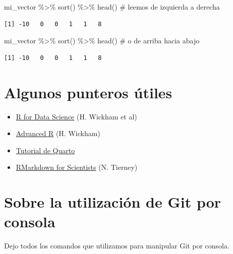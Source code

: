 \documentclass[
  letterpaper,
  DIV=11,
  numbers=noendperiod]{scrartcl}
\newenvironment{Shaded}{\begin{snugshade}}{\end{snugshade}}
\newcommand{\CommentTok}[1]{\textcolor[rgb]{0.37,0.37,0.37}{#1}}
\newcommand{\FunctionTok}[1]{\textcolor[rgb]{0.28,0.35,0.67}{#1}}
\newcommand{\NormalTok}[1]{\textcolor[rgb]{0.00,0.23,0.31}{#1}}
\newcommand{\SpecialCharTok}[1]{\textcolor[rgb]{0.37,0.37,0.37}{#1}}
\providecommand{\tightlist}{%
  \setlength{\itemsep}{0pt}\setlength{\parskip}{0pt}}
\begin{document}
\begin{Shaded}
\begin{Highlighting}[]
\NormalTok{mi\_vector }\SpecialCharTok{\%\textgreater{}\%} \FunctionTok{sort}\NormalTok{() }\SpecialCharTok{\%\textgreater{}\%} \FunctionTok{head}\NormalTok{() }\CommentTok{\# leemos de izquierda a derecha}
\end{Highlighting}
\end{Shaded}

\begin{verbatim}
[1] -10   0   0   1   1   8
\end{verbatim}

\begin{Shaded}
\begin{Highlighting}[]
\NormalTok{mi\_vector }\SpecialCharTok{\%\textgreater{}\%} 
  \FunctionTok{sort}\NormalTok{() }\SpecialCharTok{\%\textgreater{}\%} 
  \FunctionTok{head}\NormalTok{() }\CommentTok{\# o de arriba hacia abajo}
\end{Highlighting}
\end{Shaded}

\begin{verbatim}
[1] -10   0   0   1   1   8
\end{verbatim}

\section{Algunos punteros útiles}\label{algunos-punteros-uxfatiles}

\begin{itemize}
\tightlist
\item
  \href{https://r4ds.hadley.nz/}{R for Data Science} (H. Wickham et al)
\item
  \href{https://adv-r.hadley.nz/}{Advanced R} (H. Wickham)
\item
  \href{https://quarto.org/docs/get-started/hello/jupyter.html}{Tutorial
  de Quarto}
\item
  \href{https://rmd4sci.njtierney.com/}{RMarkdown for Scientists} (N.
  Tierney)
\end{itemize}

\section{Sobre la utilización de Git por
consola}\label{sobre-la-utilizaciuxf3n-de-git-por-consola}

Dejo todos los comandos que utilizamos para manipular Git por consola.
\end{document}
